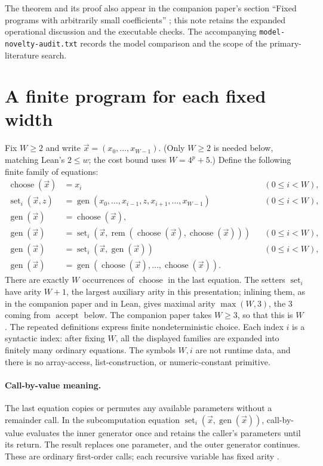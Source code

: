 \documentclass[11pt]{article}
\newcommand{\rem}{\operatorname{rem}}
\newcommand{\Gen}{\operatorname{gen}}
\newcommand{\Pick}{\operatorname{choose}}
\newcommand{\Set}{\operatorname{set}}
\newcommand{\AcceptCandidate}{\operatorname{accept}}
\begin{document}
The theorem and its proof also appear in the companion paper's section
``Fixed programs with arbitrarily small coefficients'' \cite{companion};
this note retains the expanded operational discussion and the executable
checks. The accompanying \texttt{model-novelty-audit.txt} records the model
comparison and the scope of the primary-literature search.

\section{A finite program for each fixed width}\label{sec:width}

Fix $W\geq2$ and write $\vec x=(x_0,\ldots,x_{W-1})$.
(Only $W\geq2$ is needed below, matching Lean's $2\leq w$; the cost bound uses
$W=4^p+5$.)
Define the following finite family of equations:
\begin{align*}
\Pick(\vec x)&=x_i &&(0\leq i<W),\\
\Set_i(\vec x,z)&=\Gen(x_0,\ldots,x_{i-1},z,x_{i+1},\ldots,x_{W-1})
  &&(0\leq i<W),\\
\Gen(\vec x)&=\Pick(\vec x),\\
\Gen(\vec x)&=\Set_i(\vec x,
   \rem(\Pick(\vec x),\Pick(\vec x))) &&(0\leq i<W),\\
\Gen(\vec x)&=\Set_i(\vec x,\Gen(\vec x)) &&(0\leq i<W),\\
\Gen(\vec x)&=\Gen(\Pick(\vec x),\ldots,\Pick(\vec x)).
\end{align*}
There are exactly $W$ occurrences of $\Pick$ in the last equation.
The setters $\Set_i$ have arity $W+1$, the largest auxiliary arity in this
presentation; inlining them, as in the companion paper and in Lean, gives
maximal arity $\max(W,3)$, the $3$ coming from $\AcceptCandidate$ below.
The companion paper takes $W\geq3$, so that this is $W$.
The repeated definitions express finite nondeterministic choice.
Each index $i$ is a syntactic index: after fixing $W$, all the displayed
families are expanded into finitely many ordinary equations.
The symbols $W,i$ are not runtime data, and there is no array-access,
list-construction, or numeric-constant primitive.

\paragraph{Call-by-value meaning.}
The last equation copies or permutes any available parameters without a
remainder call. In the subcomputation equation
$\Set_i(\vec x,\Gen(\vec x))$, call-by-value evaluates the inner generator
once and retains the caller's parameters until its return. The result replaces
one parameter, and the outer generator continues.
These are ordinary first-order calls; each recursive variable has fixed
arity \cite[\S\S2A, 2D]{book}.
\end{document}
